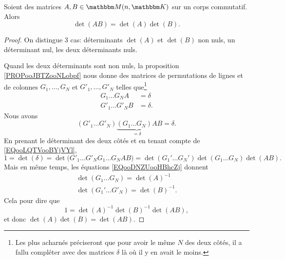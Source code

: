 \begin{proposition}    \label{PROPooUCZVooPkloQp} \label{PROPooWVJFooTmqoec}  \label{PROPooHQNPooIfPEDH}
    Soient des matrices \( A,B\in \eM(n,\eK)\) sur un corps commutatif. Alors
    \begin{equation}
        \det(AB)=\det(A)\det(B).
    \end{equation}
\end{proposition}

\begin{proof}
    On distingue 3 cas: déterminants \(\det(A) \) et \(\det(B) \) non nuls, un déterminant nul, les deux déterminants nuls.
    
   Quand les deux déterminants sont non nuls, la proposition \ref{PROPooJBTZooNLobpf} nous donne des matrices de permutations de lignes et de colonnes \( G_1,\ldots, G_N\) et \( G'_1,\ldots, G'_N\) telles que\footnote{Les plus acharnés préciseront que pour avoir le même \( N\) des deux côtés, il a fallu compléter avec des matrices \( \delta\) là où il y en avait le moins.}
    \begin{subequations}        \label{EQooDNZUooHBhcZj}
        \begin{align}
            G_1\ldots G_NA&=\delta\\
            G'_1\ldots G'_NB&=\delta.
        \end{align}
    \end{subequations}
    Nous avons
    \begin{equation}
        (G'_1\ldots G'_N)\underbrace{(G_1\ldots G_N)A}_{=\delta}B=\delta.
    \end{equation}
    En prenant le déterminant des deux côtés et en tenant compte de \eqref{EQooLQTVooBYjVYl},
    \begin{equation}
        1=\det(\delta)=\det\big(  G'_1\ldots G'_NG_1\ldots G_NAB\big)=\det(G_1'\ldots G_N')\det(G_1\ldots G_N)\det(AB).
    \end{equation}
    Mais en même temps, les équations \ref{EQooDNZUooHBhcZj} donnent
    \begin{subequations}
        \begin{align}
            \det(G_1\ldots G_N)=\det(A)^{-1}\\
            \det(G_1'\ldots G'_N)=\det(B)^{-1}.
        \end{align}
    \end{subequations}
    Cela pour dire que
    \begin{equation}
        1=\det(A)^{-1}\det(B)^{-1}\det(AB),
    \end{equation}
    et donc \( \det(A)\det(B)=\det(AB)\).


\end{proof}
